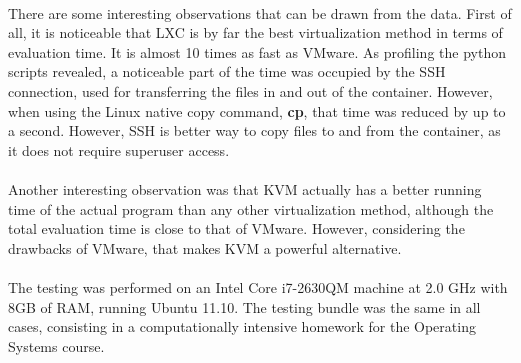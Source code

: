 \paragraph { }

There are some interesting observations that can be drawn from the data. First
of all, it is noticeable that LXC is by far the best virtualization method
in terms of evaluation time. It is almost 10 times as fast as VMware.
As profiling the python scripts revealed, a noticeable part of the time
was occupied by the SSH connection, used for transferring the files in and out
of the container. However, when using the Linux native copy command, {\bf cp},
that time was reduced by up to a second. However, SSH is better way to
copy files to and from the container, as it does not require superuser access.

\paragraph { }

Another interesting observation was that KVM actually has a better running
time of the actual program than any other virtualization method,
 although the total evaluation time is close to that of VMware. 
 However, considering the drawbacks of VMware, that makes KVM a powerful
alternative.

\paragraph { } 

The testing was performed on an Intel Core i7-2630QM machine at 2.0 GHz with 8GB
of RAM, running Ubuntu 11.10. The testing bundle was the same in all cases,
consisting in a computationally intensive homework for the Operating Systems course.


